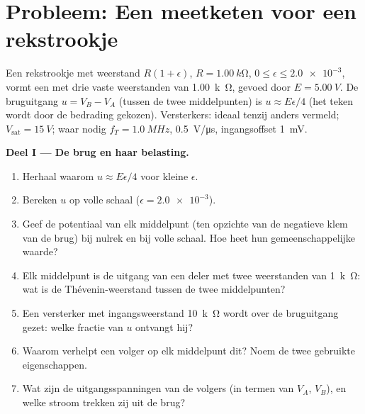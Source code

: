 \section{Probleem: Een meetketen voor een rekstrookje}

\begin{problem}
\label{pb:b1:operational-amplifier:1}
Een rekstrookje met weerstand $R(1 + \epsilon)$, $R = \qty{1.00}{k\ohm}$,
$0 \leq \epsilon \leq \num{2.0e-3}$, vormt een  met
drie vaste weerstanden van \qty{1.00}{k\ohm}, gevoed door $E = \qty{5.00}{V}$.
De bruguitgang $u = V_B - V_A$ (tussen de twee middelpunten) is
$u \approx E\epsilon/4$ (het teken wordt door de bedrading gekozen). Versterkers:
ideaal tenzij anders vermeld; $V_{\mathrm{sat}} = \qty{15}{V}$; waar nodig
$f_T = \qty{1.0}{MHz}$,  \qty{0.5}{V/\micro s}, ingangsoffset
\qty{1}{mV}.

\medskip
\noindent\textbf{Deel I --- De brug en haar belasting.}
\begin{enumerate}
  \item Herhaal waarom $u \approx E\epsilon/4$ voor kleine $\epsilon$.
  \item Bereken $u$ op volle schaal ($\epsilon = \num{2.0e-3}$).
  \item Geef de potentiaal van elk middelpunt (ten opzichte van de negatieve
        klem van de brug) bij nulrek en bij volle schaal. Hoe heet
        hun gemeenschappelijke waarde?
  \item Elk middelpunt is de uitgang van een deler met twee weerstanden van \qty{1}{k\ohm}:
        wat is de Thévenin-weerstand tussen de
        twee middelpunten?
  \item Een versterker met ingangsweerstand \qty{10}{k\ohm} wordt
        over de bruguitgang gezet: welke fractie van $u$ ontvangt hij?
  \item Waarom verhelpt een volger op elk middelpunt dit? Noem de twee
        gebruikte eigenschappen.
  \item Wat zijn de uitgangsspanningen van de volgers (in termen van $V_A$,
        $V_B$), en welke stroom trekken zij uit de brug?
\end{enumerate}


\end{problem}
